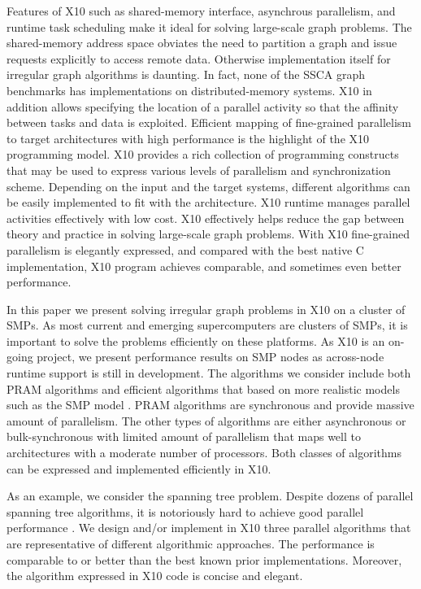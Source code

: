 Features of X10 such as shared-memory interface, asynchrous parallelism, and runtime task scheduling make it ideal for solving large-scale graph problems. The shared-memory address space obviates the need to partition a graph and issue requests explicitly to access remote data. Otherwise implementation itself for irregular graph algorithms is daunting. In fact, none of the SSCA \cite{KK05} graph benchmarks has implementations on distributed-memory systems. X10 in addition allows specifying the location of a parallel activity so that the affinity between tasks and data is exploited. 
Efficient mapping of fine-grained parallelism to target architectures with high performance is the highlight of the X10 programming model. X10 provides a rich collection of programming constructs that may be used to express various levels of parallelism and synchronization scheme. Depending on the input and the target systems, different algorithms can be easily implemented to fit with the architecture. X10 runtime manages parallel activities effectively with low cost.
X10 effectively helps reduce the gap between theory and practice in solving large-scale graph problems. With X10 fine-grained parallelism is elegantly expressed, and compared with the best native C implementation, X10 program achieves comparable, and sometimes even better performance. 


 In this paper we present solving irregular graph problems in X10 on a cluster of SMPs. As most current and emerging supercomputers are clusters of SMPs, it is important to solve the problems efficiently on these platforms. As X10 is an on-going project, we present performance results on SMP nodes as across-node runtime support is still in development. The algorithms we consider include both PRAM algorithms and efficient algorithms that based on more realistic models such as the SMP model \cite{HJ01}. PRAM algorithms are synchronous and provide massive amount of parallelism. The other types of algorithms are either asynchronous or bulk-synchronous with limited amount of parallelism that maps well to architectures with a moderate number of processors. Both classes of algorithms can be expressed and implemented efficiently in X10.

As an example, we consider the spanning tree problem. Despite dozens of parallel spanning tree algorithms, it is notoriously hard to achieve good parallel performance \cite{BC04a}. We design and/or implement in X10 three parallel algorithms that are representative of different algorithmic approaches. The performance is comparable to or better than the best known prior implementations. Moreover, the algorithm expressed in X10 code is concise and elegant.

